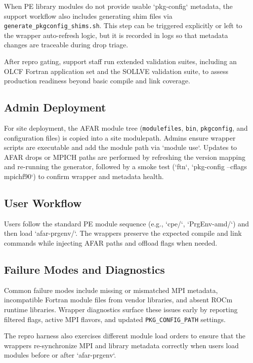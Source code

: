 When PE library modules do not provide usable `pkg-config` metadata, the
support workflow also includes generating shim files via
\texttt{generate\_pkgconfig\_shims.sh}. This step can be
triggered explicitly or left to the wrapper auto-refresh logic, but it is
recorded in logs so that metadata changes are traceable during drop triage.

After repro gating, support staff run extended validation suites, including an
OLCF Fortran application set and the SOLLVE validation suite, to assess
production readiness beyond basic compile and link coverage.

\subsection{Admin Deployment}
\label{sec:admin}
For site deployment, the AFAR module tree (\texttt{modulefiles}, \texttt{bin},
\texttt{pkgconfig}, and configuration files) is copied into a site modulepath.
Admins ensure wrapper scripts are executable and add the module path via
`module use`. Updates to AFAR drops or MPICH paths are performed by refreshing
the version mapping and re-running the generator, followed by a smoke test
(`ftn`, `pkg-config --cflags mpichf90`) to confirm wrapper and metadata health.

\subsection{User Workflow}
\label{sec:user-workflow}
Users follow the standard PE module sequence (e.g., `cpe/\peversion`,
`PrgEnv-amd/\prgenvversion`) and then load `afar-prgenv/\afarversion`. The
wrappers preserve the expected compile and link commands while injecting AFAR
paths and offload flags when needed.

\subsection{Failure Modes and Diagnostics}
\label{sec:diagnostics}
Common failure modes include missing or mismatched MPI metadata, incompatible
Fortran module files from vendor libraries, and absent ROCm runtime libraries.
Wrapper diagnostics surface these issues early by reporting filtered flags,
active MPI flavors, and updated \texttt{PKG\_CONFIG\_PATH} settings.

The repro harness also exercises different module load orders to ensure that
the wrappers re-synchronize MPI and library metadata correctly when users load
modules before or after `afar-prgenv`.
